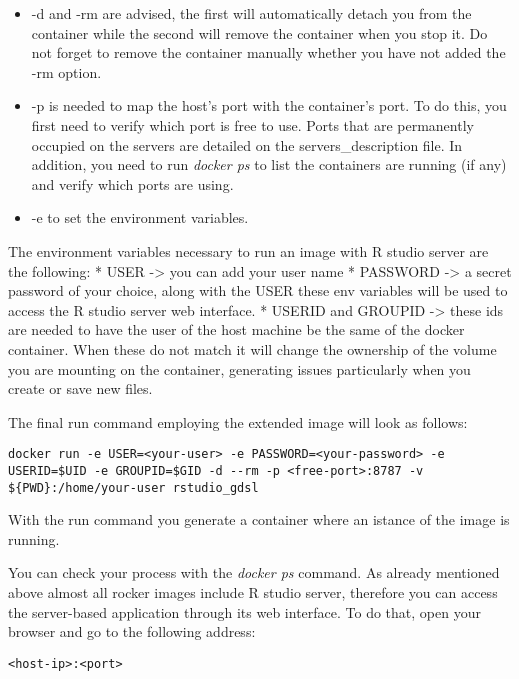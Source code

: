 \documentclass[
]{book}
\providecommand{\tightlist}{%
  \setlength{\itemsep}{0pt}\setlength{\parskip}{0pt}}
\begin{document}
\begin{itemize}
\tightlist
\item
  -d and -rm are advised, the first will automatically detach you from the container while the second will remove the container when you stop it. Do not forget to remove the container manually whether you have not added the -rm option.
\item
  -p is needed to map the host's port with the container's port. To do this, you first need to verify which port is free to use. Ports that are permanently occupied on the servers are detailed on the servers\_description file. In addition, you need to run \emph{docker ps} to list the containers are running (if any) and verify which ports are using.
\item
  -e to set the environment variables.
\end{itemize}

The environment variables necessary to run an image with R studio server are the following:
* USER -\textgreater{} you can add your user name
* PASSWORD -\textgreater{} a secret password of your choice, along with the USER these env variables will be used to access the R studio server web interface.
* USERID and GROUPID -\textgreater{} these ids are needed to have the user of the host machine be the same of the docker container. When these do not match it will change the ownership of the volume you are mounting on the container, generating issues particularly when you create or save new files.

The final run command employing the extended image will look as follows:

\begin{verbatim}
docker run -e USER=<your-user> -e PASSWORD=<your-password> -e USERID=$UID -e GROUPID=$GID -d --rm -p <free-port>:8787 -v ${PWD}:/home/your-user rstudio_gdsl
\end{verbatim}

With the run command you generate a container where an istance of the image is running.

You can check your process with the \emph{docker ps} command. As already mentioned above almost all rocker images include R studio server, therefore you can access the server-based application through its web interface. To do that, open your browser and go to the following address:

\begin{verbatim}
<host-ip>:<port>
\end{verbatim}
\end{document}
